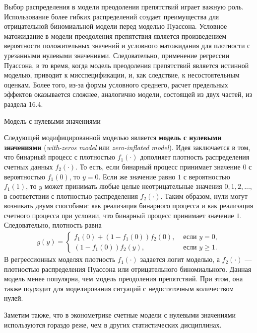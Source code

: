 Выбор распределения в модели преодоления препятствий играет важную роль. Использование более гибких распределений создает преимущества для отрицательной биномиальной модели перед моделью Пуассона. Условное матожидание в модели преодоления препятствия является произведением вероятности положительных значений и условного матожидания для плотности с урезанными нулевыми значениями. Следовательно, применение регрессии Пуассона, в то время, когда модель преодоления препятствий является истинной моделью, приводит к мисспецификации, и, как следствие, к несостоятельным оценкам. Более того, из-за формы условного среднего, расчет предельных эффектов оказывается сложнее, аналогично модели, состоящей из двух частей, из раздела 16.4.

        \begin{center}{Модель с нулевыми значениями}\end{center}
\noindent
Следующей модифицированной моделью является \textbf{модель с нулевыми значениями} (\textit{with-zeros model} или \textit{zero-inflated model}). Идея заключается в том, что бинарный процесс с плотностью $f_1(\cdot)$ дополняет плотность распределения счетных данных $f_2(\cdot)$. То есть, если бинарный процесс принимает значение $0$ с вероятностью $f_1(0)$, то $y = 0$. Если же значение равно $1$ с вероятностью $f_1(1)$, то $y$ может принимать любые целые неотрицательные значения $0, 1, 2, ...$, в соответствии с плотностью распределения $f_2(\cdot)$. Таким образом, нули могут возникать двумя способами: как реализация бинарного процесса и как реализация счетного процесса при условии, что бинарный процесс принимает значение $1$. Следовательно, плотность равна
    \begin{align}\label{eq:20.19}
    g(y) =\begin{cases}
                f_1(0) + (1 - f_1(0)) f_2(0),              & \text{ если }y = 0, \\
                (1 - f_1(0))f_2(y),                        & \text{ если }y \ge 1.
                \end{cases}
    \end{align}
В регрессионных моделях плотность $f_1(\cdot)$ задается логит моделью, а $f_2(\cdot)$ --- плотностью распределения Пуассона или отрицательного биномиального. Данная модель менее популярна, чем модель преодоления препятствий. При этом, она также подходит для моделирования ситуаций с недостаточным количеством нулей.

Заметим также, что в эконометрике счетные модели с нулевыми значениями используются гораздо реже, чем в других статистических дисциплинах.



